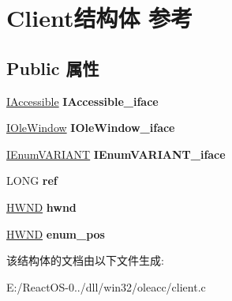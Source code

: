 \hypertarget{struct_client}{}\section{Client结构体 参考}
\label{struct_client}
\subsection*{Public 属性}
\begin{DoxyCompactItemize}
\item 
\mbox{\label{struct_client_a84e9aaea2f5b83660e0a8d0c434c5719}} 
\hyperlink{interface_i_accessible}{I\+Accessible} {\bfseries I\+Accessible\+\_\+iface}
\item 
\mbox{\label{struct_client_a6cdb5e7559deb1162fc81727bbea7be4}} 
\hyperlink{interface_i_ole_window}{I\+Ole\+Window} {\bfseries I\+Ole\+Window\+\_\+iface}
\item 
\mbox{\label{struct_client_a36c4f2713887e03b91b9f84e9e02bba1}} 
\hyperlink{interface_i_enum_v_a_r_i_a_n_t}{I\+Enum\+V\+A\+R\+I\+A\+NT} {\bfseries I\+Enum\+V\+A\+R\+I\+A\+N\+T\+\_\+iface}
\item 
\mbox{\label{struct_client_a87250d5efb4b3ec1db05dadcdfab5a5b}} 
L\+O\+NG {\bfseries ref}
\item 
\mbox{\label{struct_client_ae4207778a7b5dbf50ff938e1f70da5cb}} 
\hyperlink{interfacevoid}{H\+W\+ND} {\bfseries hwnd}
\item 
\mbox{\label{struct_client_a649e40fcf9d49884c444d799231dc9a2}} 
\hyperlink{interfacevoid}{H\+W\+ND} {\bfseries enum\+\_\+pos}
\end{DoxyCompactItemize}


该结构体的文档由以下文件生成\+:\begin{DoxyCompactItemize}
\item 
E\+:/\+React\+O\+S-\/0../dll/win32/oleacc/client.\+c\end{DoxyCompactItemize}
